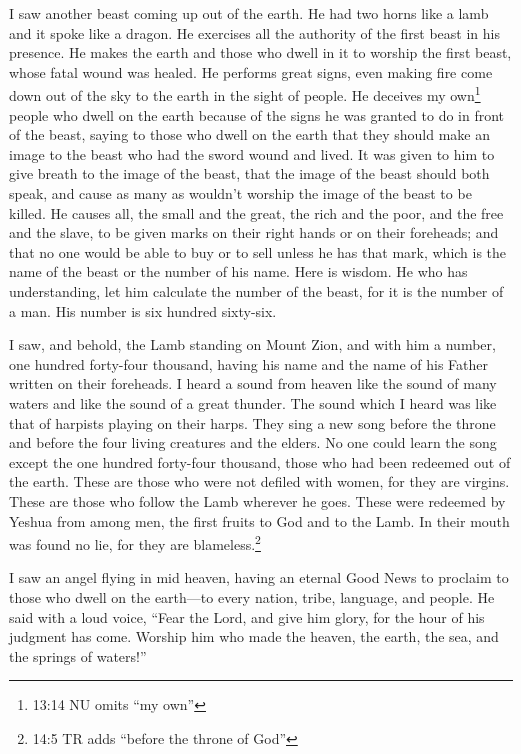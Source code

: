 \myverse{}I saw another beast coming up out of the earth. He had two horns
like a lamb and it spoke like a dragon. \myverse{}He exercises all the authority of the first beast in his presence. He makes
the earth and those who dwell in it to worship the first beast, whose fatal wound was healed.
\myverse{}He performs great signs, even making fire come down out of the sky to the
earth in the sight of people.
\myverse{}He deceives my own\footnote{13:14 NU omits “my own”} people who dwell on the earth because of the signs he was granted
to do in front of the beast, saying to those who dwell on the earth that they should make an image to
the beast who had the sword wound and lived.
\myverse{}It was given to him to give breath to the image of the beast, that the image
of the beast should both speak, and cause as many as wouldn’t worship the image of the beast to be killed.
\myverse{}He causes all, the small and the great, the rich and the poor, and the free
and the slave, to be given marks on their right hands or on their foreheads;
\myverse{}and that no one would be able to buy or to sell unless he has that mark,
which is the name of the beast or the number of his name.
\myverse{}Here is wisdom. He who has understanding, let him calculate the number of
the beast, for it is the number of a man. His number is six hundred sixty-six.



\mychapter{} \myverse*{}I saw, and behold, the Lamb standing on Mount Zion, and with him
a number, one hundred forty-four thousand, having his name and the name of his Father written on their
foreheads.
\myverse{}I heard a sound from heaven like the sound of many waters and like the sound
of a great thunder. The sound which I heard was like that of harpists playing on their harps.
\myverse{}They sing a new song before the throne and before the four living creatures
and the elders. No one could learn the song except the one hundred forty-four thousand, those who had
been redeemed out of the earth.
\myverse{}These are those who were not defiled with women, for they are virgins. These
are those who follow the Lamb wherever he goes. These were redeemed by Yeshua from among men, the first
fruits to God and to the Lamb.
\myverse{}In their mouth was found no lie, for they are blameless.\footnote{14:5 TR adds “before the throne of God”}

\myverse{}I saw an angel flying in mid heaven, having an eternal Good News
to proclaim to those who dwell on the earth—to every nation, tribe, language, and people.
\myverse{}He said with a loud voice, “Fear the Lord, and give him glory, for the hour
of his judgment has come. Worship him who made the heaven, the earth, the sea, and the springs of waters!”

